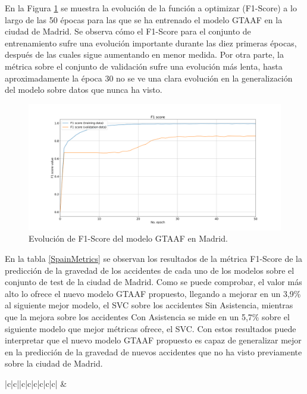 \documentclass{uathesis-es}
\begin{document}
{En la Figura \ref{MadridLossFunction} se muestra la evolución de la función a optimizar (F1-Score) a lo largo de las 50 épocas para las que se ha entrenado el modelo GTAAF en la ciudad de Madrid. Se observa cómo el F1-Score para el conjunto de entrenamiento sufre una evolución importante durante las diez primeras épocas, después de las cuales sigue aumentando en menor medida. Por otra parte, la métrica sobre el conjunto de validación sufre una evolución más lenta, hasta aproximadamente la época 30 no se ve una clara evolución en la generalización del modelo sobre datos que nunca ha visto.


\begin{figure}[H]
\centering
    \includegraphics[width=160mm]{Figures/Madrid/madrid_convolution_2d_f1_score_2023-12-03-12 54 29.png}
    \caption{Evolución de F1-Score del modelo GTAAF en Madrid.}
\label{MadridLossFunction}
\end{figure}

En la tabla \ref{SpainMetrics} se observan los resultados de la métrica F1-Score de la predicción de la gravedad de los accidentes de cada uno de los modelos sobre el conjunto de test de la ciudad de Madrid. Como se puede comprobar, el valor más alto lo ofrece el nuevo modelo GTAAF propuesto, llegando a mejorar en un 3,9\% al siguiente mejor modelo, el SVC sobre los accidentes Sin Asistencia, mientras que la mejora sobre los accidentes Con Asistencia se mide en un 5,7\% sobre el siguiente modelo que mejor métricas ofrece, el SVC. Con estos resultados puede interpretar que el nuevo modelo GTAAF propuesto es capaz de generalizar mejor en la predicción de la gravedad de nuevos accidentes que no ha visto previamente sobre la ciudad de Madrid.

\begin{table}[H]
    \begin{center}
        \begin{tabular}{|c|c||c|c|c|c|c|c|}
        \hline
         &
         \\ \hline


\end{tabular}
\end{center}
\end{table}}
\end{document}
